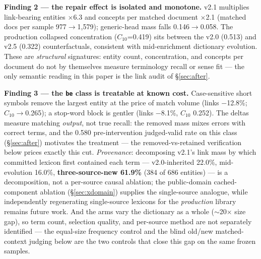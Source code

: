 \documentclass[sigconf,nonacm,anonymous]{acmart}
\begin{document}
\textbf{Finding 2 --- the repair effect is isolated and monotone.}
v2.1 multiplies link-bearing entities $\times$6.3 and concepts per
matched document $\times$2.1 (matched docs per sample 977$\to$1{,}579); generic-head mass falls
0.146$\to$0.058. The production collapsed concentration ($C_{10}$=0.419)
sits between the v2.0 (0.513) and v2.5 (0.322) counterfactuals,
consistent with mid-enrichment dictionary evolution. These are
\emph{structural} signatures: entity count, concentration, and
concepts per document do not by themselves measure terminology recall
or sense fit --- the only semantic reading in this paper is the link
audit of \S\ref{sec:after}.

\textbf{Finding 3 --- the \texttt{be} class is treatable at known cost.}
Case-sensitive short symbols remove the largest entity at the price of
match volume (links $-$12.8\%; $C_{10}\to$0.265); a stop-word block is
gentler (links $-$8.1\%, $C_{10}$ 0.252). The deltas measure matching
\emph{output}, not true recall: the removed mass mixes errors with
correct terms, and the 0.580 pre-intervention judged-valid rate on this
class (\S\ref{sec:after}) motivates the treatment --- the
removed-vs-retained verification below prices exactly this cut.
\emph{Provenance}: decomposing
v2.1's link mass by which committed lexicon first contained each term
--- v2.0-inherited 22.0\%, mid-evolution 16.0\%,
\textbf{three-source-new 61.9\%} (384 of 686 entities) --- is a
decomposition, not a per-source causal ablation; the public-domain
cached-component ablation (\S\ref{sec:xdomain}) supplies the
single-source analogue, while independently regenerating single-source
lexicons for the \emph{production} library remains future work. And the arms
vary the dictionary as a whole (${\sim}$20$\times$ size gap), so term
count, selection quality, and per-source method are not separately
identified --- the equal-size frequency control and the blind
old/new matched-context judging below are the two controls that
close this gap on the same frozen samples.
\end{document}
